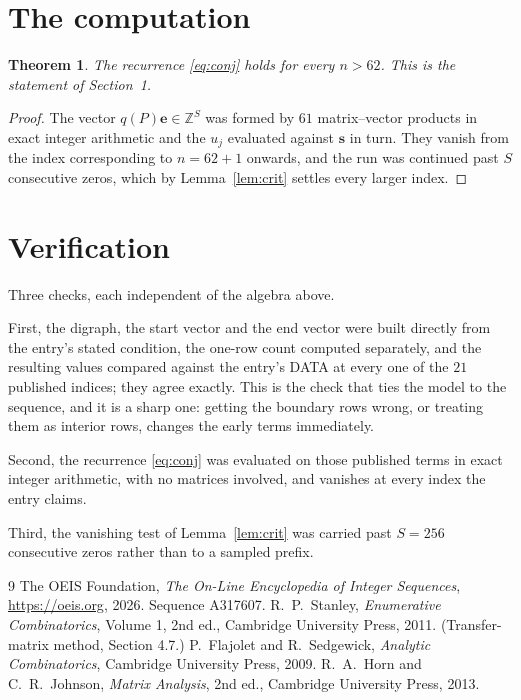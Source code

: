 \documentclass[11pt,a4paper]{article}
\theoremstyle{plain}
\newtheorem{theorem}{Theorem}
\theoremstyle{definition}
\begin{document}
\section{The computation}

\begin{theorem}
The recurrence \eqref{eq:conj} holds for every $n>62$. This is the statement of
Section~1.
\end{theorem}

\begin{proof}
The vector $q(P)\mathbf{e}\in\mathbb{Z}^{S}$ was formed by $61$ matrix--vector
products in exact integer arithmetic and the $u_j$ evaluated against $\mathbf{s}$ in turn.
They vanish from the index corresponding to $n=62+1$ onwards, and the run was continued
past $S$ consecutive zeros, which by Lemma~\ref{lem:crit} settles every larger index.
\end{proof}

\section{Verification}

Three checks, each independent of the algebra above.

First, the digraph, the start vector and the end vector were built directly from the
entry's stated condition, the one-row count computed separately, and the resulting values
compared against the entry's DATA at every one of the $21$ published indices; they
agree exactly. This is the check that ties the model to the sequence, and it is a sharp one:
getting the boundary rows wrong, or treating them as interior rows, changes the early terms
immediately.

Second, the recurrence \eqref{eq:conj} was evaluated on those published terms in exact
integer arithmetic, with no matrices involved, and vanishes at every index the entry claims.

Third, the vanishing test of Lemma~\ref{lem:crit} was carried past $S=256$ consecutive
zeros rather than to a sampled prefix.

\begin{thebibliography}{9}
 The OEIS Foundation, \emph{The On-Line Encyclopedia of Integer
Sequences}, \url{https://oeis.org}, 2026. Sequence A317607.
 R.~P.~Stanley, \emph{Enumerative Combinatorics}, Volume 1, 2nd ed.,
Cambridge University Press, 2011. (Transfer-matrix method, Section 4.7.)
 P.~Flajolet and R.~Sedgewick, \emph{Analytic Combinatorics}, Cambridge
University Press, 2009.
 R.~A.~Horn and C.~R.~Johnson, \emph{Matrix Analysis}, 2nd ed., Cambridge
University Press, 2013.
\end{thebibliography}
\end{document}
